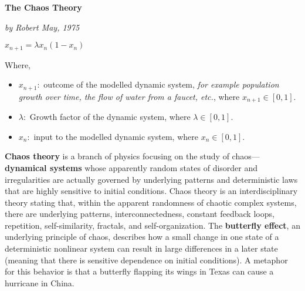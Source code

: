 \centerline{\huge \textbf{The Chaos Theory}}
\centerline{\textit{by Robert May, 1975}}
\begin{center}
\centerline{\huge $x_{n+1}=\lambda x_n(1-x_n)$}
\end{center}
Where,
\begin{itemize}
    \item $x_{n+1}:$ outcome of the modelled dynamic system, \textit{for example population growth over time, the flow of water from a faucet, etc.}, where $x_{n+1}\in[0,1]$.
    \item $\lambda:$ Growth factor of the dynamic system, where $\lambda\in [0,1]$.
    \item $x_n:$ input to the modelled dynamic system, where $x_{n}\in[0,1]$.  
\end{itemize}
\textbf{Chaos theory} is a branch of physics focusing on the study of chaos—\textbf{dynamical systems} whose apparently random states of disorder and irregularities are actually governed by underlying patterns and deterministic laws that are highly sensitive to initial conditions. Chaos theory is an interdisciplinary theory stating that, within the apparent randomness of chaotic complex systems, there are underlying patterns, interconnectedness, constant feedback loops, repetition, self-similarity, fractals, and self-organization. The \textbf{butterfly effect}, an underlying principle of chaos, describes how a small change in one state of a deterministic nonlinear system can result in large differences in a later state (meaning that there is sensitive dependence on initial conditions). A metaphor for this behavior is that a butterfly flapping its wings in Texas can cause a hurricane in China.
